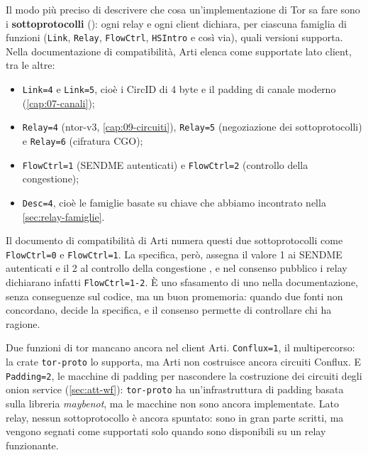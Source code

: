 Il modo più preciso di descrivere che cosa un'implementazione di Tor sa fare sono i \textbf{sottoprotocolli} (): ogni relay e ogni client dichiara, per ciascuna famiglia di funzioni (\texttt{Link}, \texttt{Relay}, \texttt{FlowCtrl}, \texttt{HSIntro} e così via), quali versioni supporta. Nella documentazione di compatibilità, Arti elenca come supportate lato client, tra le altre:
\begin{itemize}
  \item \texttt{Link=4} e \texttt{Link=5}, cioè i CircID di 4 byte e il padding di canale moderno (\cref{cap:07-canali});
  \item \texttt{Relay=4} (ntor-v3, \cref{cap:09-circuiti}), \texttt{Relay=5} (negoziazione dei sottoprotocolli) e \texttt{Relay=6} (cifratura CGO);
  \item \texttt{FlowCtrl=1} (SENDME autenticati) e \texttt{FlowCtrl=2} (controllo della congestione);
  \item \texttt{Desc=4}, cioè le famiglie basate su chiave che abbiamo incontrato nella \cref{sec:relay-famiglie}.
\end{itemize}
\begin{attenzione}
Il documento di compatibilità di Arti numera questi due sottoprotocolli come \texttt{FlowCtrl=0} e \texttt{FlowCtrl=1}. La specifica, però, assegna il valore 1 ai SENDME autenticati e il 2 al controllo della congestione , e nel consenso pubblico i relay dichiarano infatti \texttt{FlowCtrl=1-2}. È uno sfasamento di uno nella documentazione, senza conseguenze sul codice, ma un buon promemoria: quando due fonti non concordano, decide la specifica, e il consenso permette di controllare chi ha ragione.
\end{attenzione}

Due funzioni di tor mancano ancora nel client Arti. \texttt{Conflux=1}, il multipercorso: la crate \texttt{tor-proto} lo supporta, ma Arti non costruisce ancora circuiti Conflux. E \texttt{Padding=2}, le macchine di padding per nascondere la costruzione dei circuiti degli onion service (\cref{sec:att-wf}): \texttt{tor-proto} ha un'infrastruttura di padding basata sulla libreria \emph{maybenot}, ma le macchine non sono ancora implementate. Lato relay, nessun sottoprotocollo è ancora spuntato: sono in gran parte scritti, ma vengono segnati come supportati solo quando sono disponibili su un relay funzionante.


